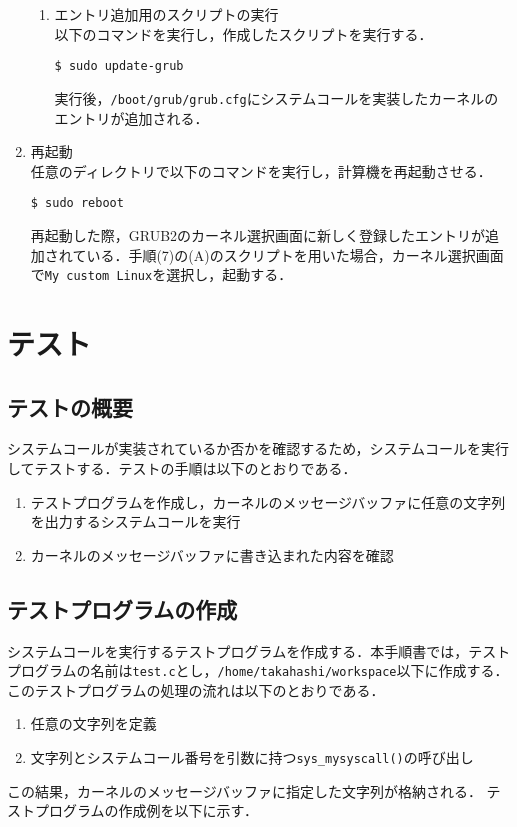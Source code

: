 \documentclass[12pt]{jsarticle}
\begin{document}
\begin{enumerate}
\begin{enumerate}
\item エントリ追加用のスクリプトの実行\\
  以下のコマンドを実行し，作成したスクリプトを実行する．
\begin{verbatim}
$ sudo update-grub
\end{verbatim}
実行後，\verb|/boot/grub/grub.cfg|にシステムコールを実装したカーネルのエントリが追加される．
  \end{enumerate}
  
\item 再起動 \\
  任意のディレクトリで以下のコマンドを実行し，計算機を再起動させる．
\begin{verbatim}
$ sudo reboot
\end{verbatim}
再起動した際，GRUB2のカーネル選択画面に新しく登録したエントリが追加されている．手順(7)の(A)のスクリプトを用いた場合，カーネル選択画面で\verb|My custom Linux|を選択し，起動する．

\end{enumerate}

\newpage
\section{テスト}
\label{sec:test}
\subsection{テストの概要}
システムコールが実装されているか否かを確認するため，システムコールを実行してテストする．テストの手順は以下のとおりである．

\begin{enumerate}
\item テストプログラムを作成し，カーネルのメッセージバッファに任意の文字列を出力するシステムコールを実行
\item カーネルのメッセージバッファに書き込まれた内容を確認
\end{enumerate}

\subsection{テストプログラムの作成}
システムコールを実行するテストプログラムを作成する．本手順書では，テストプログラムの名前は\verb|test.c|とし，\verb|/home/takahashi/workspace|以下に作成する．このテストプログラムの処理の流れは以下のとおりである．

\begin{enumerate}
\item 任意の文字列を定義
\item 文字列とシステムコール番号を引数に持つ\verb|sys_mysyscall()|の呼び出し
\end{enumerate}
この結果，カーネルのメッセージバッファに指定した文字列が格納される．
テストプログラムの作成例を以下に示す．
\end{document}
